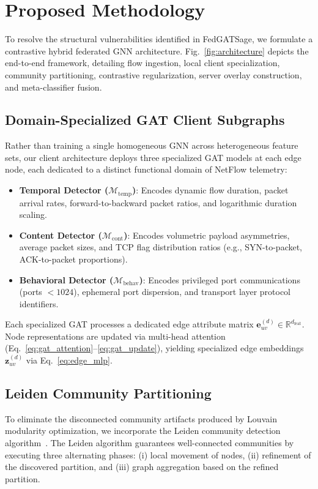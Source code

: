 \documentclass[journal,onecolumn]{IEEEtran}
\begin{document}
\section{Proposed Methodology}
\label{sec:methodology}

To resolve the structural vulnerabilities identified in FedGATSage, we formulate a contrastive hybrid federated GNN architecture. Fig.~\ref{fig:architecture} depicts the end-to-end framework, detailing flow ingestion, local client specialization, community partitioning, contrastive regularization, server overlay construction, and meta-classifier fusion.

\subsection{Domain-Specialized GAT Client Subgraphs}
Rather than training a single homogeneous GNN across heterogeneous feature sets, our client architecture deploys three specialized GAT models at each edge node, each dedicated to a distinct functional domain of NetFlow telemetry:
\begin{itemize}
    \item \textbf{Temporal Detector ($\mathcal{M}_{\text{temp}}$)}: Encodes dynamic flow duration, packet arrival rates, forward-to-backward packet ratios, and logarithmic duration scaling.
    \item \textbf{Content Detector ($\mathcal{M}_{\text{cont}}$)}: Encodes volumetric payload asymmetries, average packet sizes, and TCP flag distribution ratios (e.g., SYN-to-packet, ACK-to-packet proportions).
    \item \textbf{Behavioral Detector ($\mathcal{M}_{\text{behav}}$)}: Encodes privileged port communications (ports $< 1024$), ephemeral port dispersion, and transport layer protocol identifiers.
\end{itemize}
Each specialized GAT processes a dedicated edge attribute matrix $\boldsymbol{e}_{uv}^{(d)} \in \mathbb{R}^{d_{\text{feat}}}$. Node representations are updated via multi-head attention (Eq.~\ref{eq:gat_attention}--\ref{eq:gat_update}), yielding specialized edge embeddings $\boldsymbol{z}_{uv}^{(d)}$ via Eq.~\ref{eq:edge_mlp}.

\subsection{Leiden Community Partitioning}
To eliminate the disconnected community artifacts produced by Louvain modularity optimization, we incorporate the Leiden community detection algorithm~\cite{traag2019leiden}. The Leiden algorithm guarantees well-connected communities by executing three alternating phases: (i) local movement of nodes, (ii) refinement of the discovered partition, and (iii) graph aggregation based on the refined partition.
\end{document}
